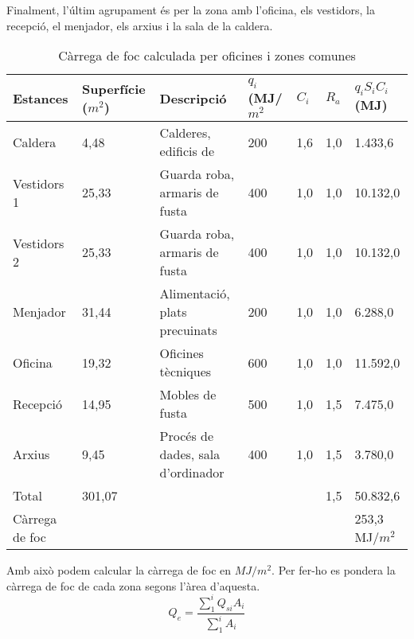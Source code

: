 \noindent Finalment, l'últim agrupament és per la zona amb l'oficina, els vestidors, la recepció, el menjador, els arxius i la sala de la caldera.
%
\begin{table}[H]
\footnotesize
\begin{center}
 \begin{tabu} to \textwidth {|X[1.5, l]|X[r]|X[2, l]|X[1, r]|X[0.5, r]|X[0.5, r]|X[r]|}%
 \hline
Estances & Superfície ($m^2$)& Descripció & $q_i$ (MJ/$m^2$ & $C_i$ &  $R_a$ & $q_{i}S_iC_i$ (MJ) \\
 \hline \hline 
Caldera & 4,48 & Calderes, edificis de & 200 & 1,6  & 1,0 & 1.433,6 \\ \hline
Vestidors 1 & 25,33 & Guarda roba, armaris de fusta & 400 & 1,0 &  1,0 & 10.132,0 \\ \hline
Vestidors 2 & 25,33 & Guarda roba, armaris de fusta & 400 & 1,0 &  1,0 & 10.132,0 \\ \hline
Menjador & 31,44 & Alimentació, plats precuinats & 200 & 1,0 &  1,0 & 6.288,0 \\ \hline
Oficina & 19,32 & Oficines tècniques & 600 & 1,0 &  1,0 & 11.592,0 \\ \hline
Recepció & 14,95 & Mobles de fusta & 500 & 1,0 &  1,5 & 7.475,0 \\ \hline
Arxius & 9,45 & Procés de dades, sala d'ordinador & 400 & 1,0 & 1,5 & 3.780,0 \\ \hline
\hline
Total & 301,07 & & & & 1,5 & 50.832,6 \\ \hline
Càrrega de foc & & 253,3 MJ/$m^2$ \\ \hline
 \end{tabu}
 \caption{Càrrega de foc calculada per oficines i zones comunes}
\end{center}
\end{table}
%
\noindent Amb això podem calcular la càrrega de foc en $MJ/m^2$. Per fer-ho es pondera la càrrega de foc de cada zona segons l'àrea d'aquesta.
%
\begin{equation}
Q_e = \frac{\sum_{1}^{i}Q_{si}A_i}{\sum_{1}^{i}A_{i}}
\end{equation}

